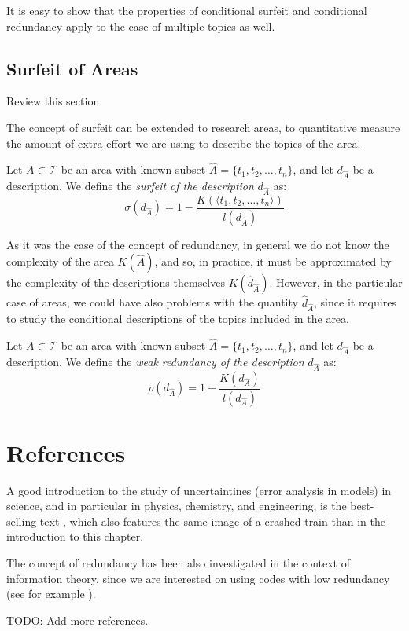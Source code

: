 It is easy to show that the properties of conditional surfeit and conditional redundancy apply to the case of multiple topics as well.

%
%

\subsection{Surfeit of Areas}

{\color{red} Review this section}

The concept of surfeit can be extended to research areas, to quantitative measure the amount of extra effort we are using to describe the topics of the area.

\begin{definition}
Let $A \subset \mathcal{T}$ be an area with known subset $\hat{A} = \{t_1, t_2, \ldots, t_n\}$, and let $d_{\hat{A}}$ be a description. We define the \emph{surfeit of the description} $d_{\hat{A}}$ as:
\[
\sigma \left( d_{\hat{A}} \right) = 1  - \frac{K( \langle t_1, t_2, \ldots, t_n \rangle )}{l \left( d_{\hat{A}} \right)}
\]
\end{definition}

As it was the case of the concept of redundancy, in general we do not know the complexity of the area $K(\hat{A})$, and so, in practice, it must be approximated by the complexity of the descriptions themselves $K(\hat{d}_{\hat{A}})$. However, in the particular case of areas, we could have also problems with the quantity $\hat{d}_{\hat{A}}$, since it requires to study the conditional descriptions of the topics included in the area.

\begin{definition}
Let $A \subset \mathcal{T}$ be an area with known subset $\hat{A} = \{t_1, t_2, \ldots, t_n\}$, and let $d_{\hat{A}}$ be a description. We define the \emph{weak redundancy of the description} $d_{\hat{A}}$ as:
\[
\rho(d_{\hat{A}}) =  1  - \frac{K \left( d_{\hat{A}} \right)}{l \left( d_{\hat{A}} \right)}
\]
\end{definition}

%
%

\section*{References}

A good introduction to the study of uncertaintines (error analysis in models) in science, and in particular in physics, chemistry, and engineering, is the best-selling text \cite{taylor2022introduction}, which also features the same image of a crashed train than in the introduction to this chapter.

The concept of redundancy has been also investigated in the context of information theory, since we are interested on using codes with low redundancy (see for example \cite{abramson1963information}).

{\color{red} TODO: Add more references.}
